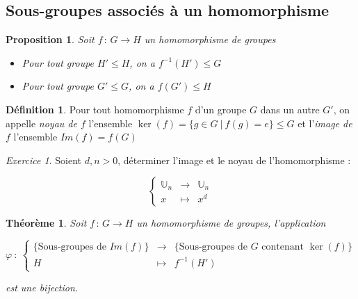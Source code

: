 \documentclass[]{article}
\newtheorem{mythm}{Théorème}
\newtheorem{myproposition}{Proposition}
\theoremstyle{remark}
\newtheorem{myexer}{Exercice}
\theoremstyle{definition}
\newtheorem{mydef}{Définition}
\newcommand{\funcshort}[3]{
#1 \, : \, #2 \longrightarrow #3
}
\begin{document}
\subsection{Sous-groupes associés à un homomorphisme}

\begin{myproposition}
	Soit $\funcshort{f}{G}{H}$ un homomorphisme de groupes
	\begin{itemize}
		\item Pour tout groupe $H' \leqslant H$, on a $f^{-1}(H') \leqslant G$
		
		\item Pour tout groupe $G' \leqslant G$, on a $f(G') \leqslant H$
	\end{itemize}
\end{myproposition}

\begin{mydef}
	Pour tout homomorphisme $f$ d'un groupe $G$ dans un autre $G'$, on appelle \textit{noyau de $f$} l'ensemble $\ker(f)=\{g \in G ~ | ~ f(g) = e\} \leqslant G$ et l'\textit{image de $f$} l'ensemble $Im(f)=f(G)$
\end{mydef}

\begin{myexer}
	Soient $d, n > 0$, déterminer l'image et le noyau de l'homomorphisme :
	
	$$\left\{
		\begin{array}{ccc}
			\mathbb{U}_n & \longrightarrow & \mathbb{U}_n \\
			x & \longmapsto & x^d
		\end{array}
	\right.$$
\end{myexer}

\begin{mythm}
	Soit $\funcshort{f}{G}{H}$ un homomorphisme de groupes, l'application
	
	$$\varphi ~ : ~ \left\{\begin{array}{rcl}
		\{\text{Sous-groupes de } Im(f)\} & \longrightarrow & \{\text{Sous-groupes de } G \text{ contenant }\ker(f)\} \\
		H & \longmapsto & f^{-1}(H')
	\end{array}\right.$$
	
	est une bijection.
\end{mythm}
\end{document}
